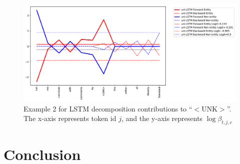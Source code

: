 \documentclass{article}
\begin{document}
\begin{figure}[t]
	\centering
	\includegraphics[width=\linewidth]{uni-UNK.pdf}
	\caption{Example 2 for LSTM decomposition contributions to ``$<$UNK$>$''. The x-axis represents token id $j$, and the y-axis represents $\log \beta_{t, j, c}$}
	\label{fig:unk}
\end{figure}



\section{Conclusion}


\nocite{*}




\end{document}
